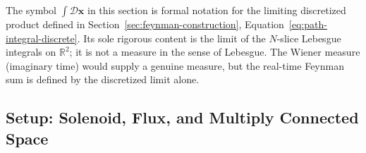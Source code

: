 \begin{note}
The symbol $\int\mathcal{D}\bm x$ in this section is formal notation for the limiting discretized product defined in Section~\ref{sec:feynman-construction}, Equation~\eqref{eq:path-integral-discrete}. Its sole rigorous content is the limit of the $N$-slice Lebesgue integrals on $\mathbb{R}^2$; it is not a measure in the sense of Lebesgue. The Wiener measure (imaginary time) would supply a genuine measure, but the real-time Feynman sum is defined by the discretized limit alone.
\end{note}

\subsection{Setup: Solenoid, Flux, and Multiply Connected Space}

